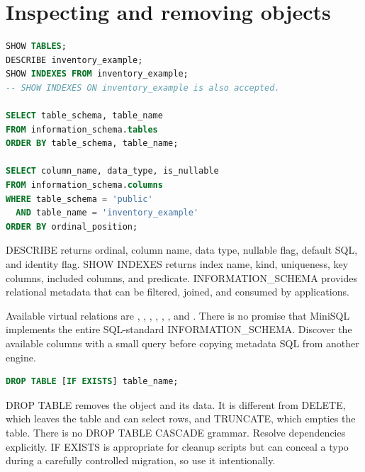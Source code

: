 \section{Inspecting and removing objects}

\begin{lstlisting}[language=SQL]
SHOW TABLES;
DESCRIBE inventory_example;
SHOW INDEXES FROM inventory_example;
-- SHOW INDEXES ON inventory_example is also accepted.

SELECT table_schema, table_name
FROM information_schema.tables
ORDER BY table_schema, table_name;

SELECT column_name, data_type, is_nullable
FROM information_schema.columns
WHERE table_schema = 'public'
  AND table_name = 'inventory_example'
ORDER BY ordinal_position;
\end{lstlisting}

DESCRIBE returns ordinal, column name, data type, nullable flag, default SQL, and identity flag. SHOW INDEXES returns index name, kind, uniqueness, key columns, included columns, and predicate. INFORMATION\_SCHEMA provides relational metadata that can be filtered, joined, and consumed by applications.

Available virtual relations are , , , , , , and . There is no promise that MiniSQL implements the entire SQL-standard INFORMATION\_SCHEMA. Discover the available columns with a small query before copying metadata SQL from another engine.

\begin{lstlisting}[language=SQL]
DROP TABLE [IF EXISTS] table_name;
\end{lstlisting}

DROP TABLE removes the object and its data. It is different from DELETE, which leaves the table and can select rows, and TRUNCATE, which empties the table. There is no DROP TABLE CASCADE grammar. Resolve dependencies explicitly. IF EXISTS is appropriate for cleanup scripts but can conceal a typo during a carefully controlled migration, so use it intentionally.



